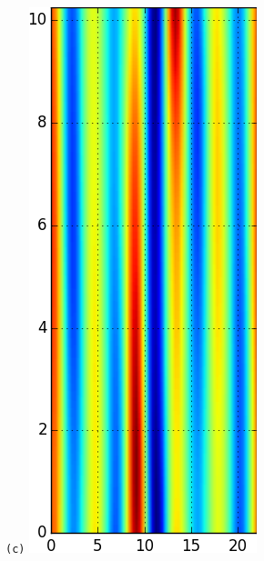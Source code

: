 \documentclass[final,leqno,onefignum,onetabnum]{siamltexmm}
\begin{document}
\begin{figure}[h]
\begin{minipage}{.115\textwidth}
  \end{minipage}
  \begin{minipage}{.115\textwidth}
    \centering \small{\texttt{(c)}}
    \includegraphics[width=\textwidth]{ppo1Fv10_64}

\end{minipage}
\end{figure}
\end{document}
